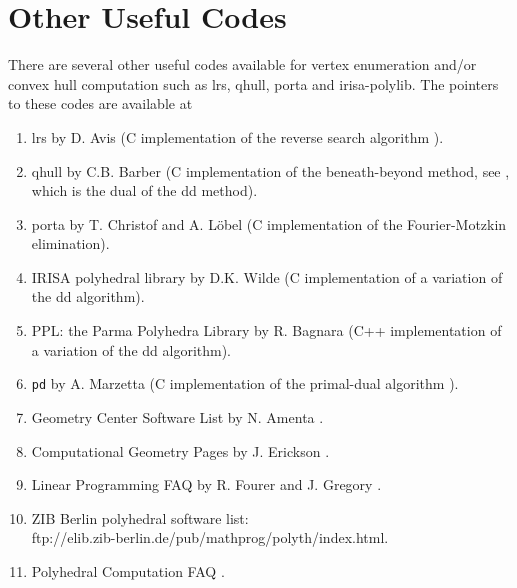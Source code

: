 \documentclass[11pt]{article}
\newcommand {\0} {{\bf 0}}
\begin{document}
\section{Other Useful Codes}  \label{CODES}
There are several other useful codes available for vertex enumeration and/or
convex hull computation  such as lrs, qhull, porta and irisa-polylib.
The pointers to these codes are available at
\begin{enumerate}
\item lrs by D. Avis \cite{a-lrshome-01} (C implementation of the reverse search algorithm 
\cite{af-pachv-92}). 

\item qhull by C.B. Barber \cite{bdh-qach-03} (C implementation of
the beneath-beyond method, see \cite{e-acg-87,m-cg-94},
which is the dual of the dd method). 

\item porta by T. Christof and A. L{\"o}bel \cite{cl-porta-97} (C implementation
of the Fourier-Motzkin elimination).

\item IRISA polyhedral library by D.K. Wilde
\cite{w-ldpo-93b} (C implementation
of a variation of the dd algorithm).

\item PPL: the Parma Polyhedra Library \cite{b-pplhome} by R. Bagnara (C++ implementation of
a variation of the dd algorithm).

\item {\tt pd} by A. Marzetta \cite{m-pdcip-97} (C implementation of the primal-dual algorithm 
\cite{bfm-pdmvf-97}). 

 \item Geometry Center Software List by N. Amenta \cite{a-dcg}.

 \item Computational Geometry Pages by J. Erickson \cite{e-cgp}.

 \item Linear Programming FAQ by R. Fourer and J. Gregory \cite{fg-lpfaq}.

 \item ZIB Berlin polyhedral software list:\\
{ftp://elib.zib-berlin.de/pub/mathprog/polyth/index.html}.


\item Polyhedral Computation FAQ \cite{f-pcfaq-98}.
\end{enumerate}
\end{document}
